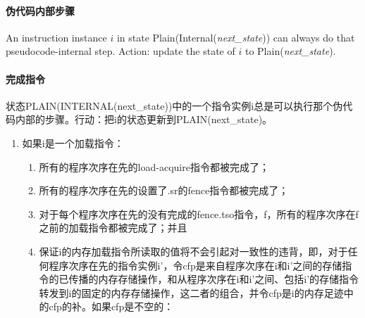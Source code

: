 \paragraph{伪代码内部步骤}\label{omm:sail_interp}
An instruction instance $i$ in state {\sc Plain}({\sc Internal}({\it next\_state})) can always do that pseudocode-internal step.
Action: update the state of $i$ to {\sc Plain}({\it next\_state}).


\paragraph{完成指令}\label{omm:finish}
状态PLAIN(INTERNAL(next_state))中的一个指令实例i总是可以执行那个伪代码内部的步骤。行动：把i的状态更新到PLAIN(next_state)。
\begin{enumerate}
\item 如果i是一个加载指令： %
  \begin{enumerate}
  \item 所有的程序次序在先的load-acquire指令都被完成了； %
  \item 所有的程序次序在先的设置了.sr的fence指令都被完成了； %
  \item 对于每个程序次序在先的没有完成的fence.tso指令，f，所有的程序次序在f之前的加载指令都被完成了；并且  %
  \item 保证i的内存加载指令所读取的值将不会引起对一致性的违背，即，对于任何程序次序在先的指令实例i’，令cfp是来自程序次序在i和i’之间的存储指令的已传播的内存存储操作，和从程序次序在i和i’之间、包括i’的存储指令转发到i的固定的内存存储操作，这二者的组合，并令cfp是i的内存足迹中的cfp的补。如果cfp是不空的： %

\end{enumerate}
\end{enumerate}
